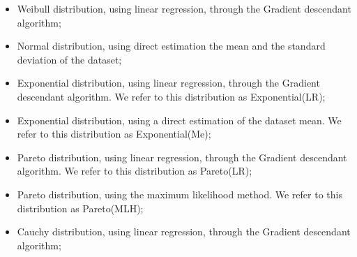 \begin{itemize}
	\item Weibull distribution, using linear regression, through the Gradient descendant algorithm;
	\item Normal distribution, using direct estimation the mean and the standard deviation of the dataset;
	\item Exponential distribution, using linear regression, through the Gradient descendant algorithm. We refer to this distribution as Exponential(LR);
	\item Exponential distribution, using a direct estimation of the dataset mean. We refer to this distribution as Exponential(Me);
	\item Pareto distribution, using linear regression, through the Gradient descendant algorithm. We refer to this distribution as Pareto(LR);
	\item Pareto distribution, using the maximum likelihood method. We refer to this distribution as Pareto(MLH);
	\item Cauchy distribution, using linear regression, through the Gradient descendant algorithm;
\end{itemize}







